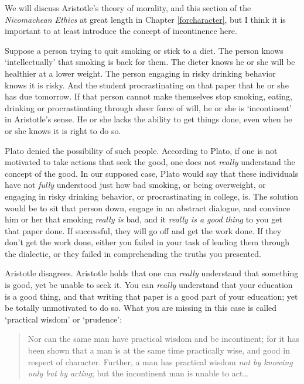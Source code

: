 We will discuss Aristotle's theory of morality, and this section of the \emph{Nicomachean Ethics} at great length in Chapter \ref{forcharacter}, but I think it is important to at least introduce the concept of incontinence here.

Suppose a person trying to quit smoking or stick to a diet. The person knows `intellectually' that smoking is back for them. The dieter knows he or she will be healthier at a lower weight. The person engaging in risky drinking behavior knows it is risky. And the student procrastinating on that paper that he or she has due tomorrow. If that person cannot make themselves stop smoking, eating, drinking or procrastinating through sheer force of will, he or she is `incontinent' in Aristotle's sense. He or she lacks the ability to get things done, even when he or she knows it is right to do so.

Plato denied the possibility of such people. According to Plato, if one is not motivated to take actions that seek the good, one does not \emph{really} understand the concept of the good. In our supposed case, Plato would say that these individuals have not \emph{fully} understood just how bad smoking, or being overweight, or engaging in risky drinking behavior, or procrastinating in college, is. The solution would be to sit that person down, engage in an abstract dialogue, and convince him or her that smoking \emph{really is} bad, and it \emph{really is a good thing} to you get that paper done. If successful, they will go off and get the work done. If they don't get the work done, either you failed in your task of leading them through the dialectic, or they failed in comprehending the truths you presented.

Aristotle disagrees. Aristotle holds that one can \emph{really} understand that something is good, yet be unable to seek it. You can \emph{really} understand that your education is a good thing, and that writing that paper is a good part of your education; yet be totally unmotivated to do so. What you are missing in this case is called `practical wisdom' or `prudence':

\begin{quote}

Nor can the same man have practical wisdom and be incontinent; for it has been shown that a man is at the same time practically wise, and good in respect of character. Further, a man has practical wisdom \emph{not by knowing only but by acting}; but the incontinent man is unable to act{\ldots} ~\citep[1152a8--11]{Aristotle:1995uq}
\end{quote}

